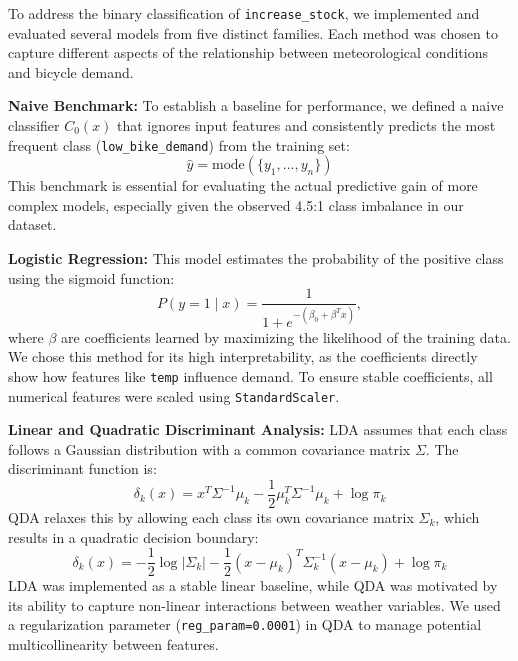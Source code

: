 \documentclass{article}
\begin{document}
To address the binary classification of \texttt{increase\_stock}, we implemented and evaluated several models from five distinct families. Each method was chosen to capture different aspects of the relationship between meteorological conditions and bicycle demand.

\textbf{Naive Benchmark:} To establish a baseline for performance, we defined a naive classifier $C_0(x)$ that ignores input features and consistently predicts the most frequent class (\texttt{low\_bike\_demand}) from the training set:
\begin{equation}
    \hat{y} = \text{mode}(\{y_1, ..., y_n\})
\end{equation}
This benchmark is essential for evaluating the actual predictive gain of more complex models, especially given the observed 4.5:1 class imbalance in our dataset.

\textbf{Logistic Regression:} This model estimates the probability of the positive class using the sigmoid function:
\begin{equation}
    P(y=1 \mid x) = \frac{1}{1 + e^{-(\beta_0 + \beta^T x)}},
\end{equation}
where $\beta$ are coefficients learned by maximizing the likelihood of the training data. We chose this method for its high interpretability, as the coefficients directly show how features like \texttt{temp} influence demand. To ensure stable coefficients, all numerical features were scaled using \texttt{StandardScaler}.

\textbf{Linear and Quadratic Discriminant Analysis:} LDA assumes that each class follows a Gaussian distribution with a common covariance matrix $\Sigma$. The discriminant function is:
\begin{equation}
    \delta_k(x) = x^T \Sigma^{-1} \mu_k - \frac{1}{2} \mu_k^T \Sigma^{-1} \mu_k + \log \pi_k
\end{equation}
QDA relaxes this by allowing each class its own covariance matrix $\Sigma_k$, which results in a quadratic decision boundary:
\begin{equation}
    \delta_k(x) = -\frac{1}{2} \log |\Sigma_k| - \frac{1}{2}(x - \mu_k)^T \Sigma_k^{-1}(x - \mu_k) + \log \pi_k
\end{equation}
LDA was implemented as a stable linear baseline, while QDA was motivated by its ability to capture non-linear interactions between weather variables. We used a regularization parameter (\texttt{reg\_param=0.0001}) in QDA to manage potential multicollinearity between features.
\end{document}
